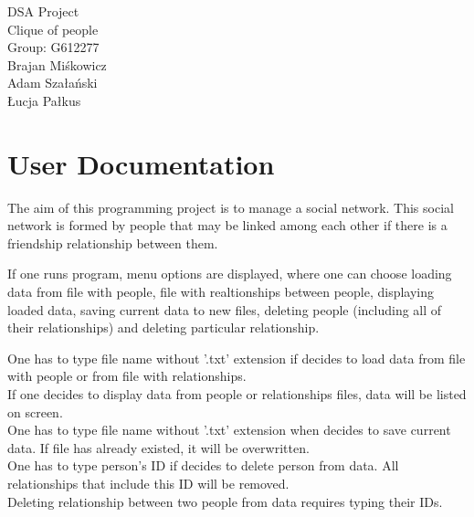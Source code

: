 \documentclass[twoside]{book}
\newcommand{\+}{\discretionary{\mbox{\scriptsize$\hookleftarrow$}}{}{}}
\newcommand{\clearemptydoublepage}{%
    \newpage{\pagestyle{empty}\cleardoublepage}%
  }
\begin{document}
  \raggedbottom
    \hypersetup{pageanchor=false,
                bookmarksnumbered=true,
                pdfencoding=unicode
               }
  \begin{titlepage}
  \vspace*{7cm}
  \begin{center}%
  {\LARGE DSA Project}\\
  \vspace*{1cm}
  {\Large Clique of people}\\
  \vspace*{4cm}
  {\Large Group: G612277}\\
  \vspace*{1cm}
  {\Large Brajan Miśkowicz}\\
  \vspace*{0.3cm}
  {\Large Adam Szałański}\\
  \vspace*{0.3cm}
  {\Large Łucja Pałkus}\\
  \end{center}
  \end{titlepage}
  \clearemptydoublepage
  \tableofcontents
  \clearemptydoublepage
  \hypersetup{pageanchor=true}
  \chapter{User Documentation}
The aim of this programming project is to manage a social network. This social network is formed by people that may be linked among each other if there is a friendship relationship between them.

If one runs program, menu options are displayed, where one can choose loading data from file with people, file with realtionships between people, displaying loaded data, saving current data to new files, deleting people (including all of their relationships) and deleting particular relationship.

One has to type file name without '.txt' extension if decides to load data from file with people or from file with relationships. \\
If one decides to display data from people or relationships files, data will be listed on screen.\\
One has to type file name without '.txt' extension when decides to save current data. If file has already existed, it will be overwritten.\\
One has to type person's ID if decides to delete person from data. All relationships that include this ID will be removed.\\
Deleting relationship between two people from data requires typing their IDs.
\end{document}
